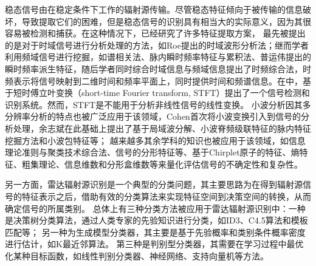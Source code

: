 稳态信号由在稳定条件下工作的辐射源传输。尽管稳态特征倾向于被传输的信息破坏，导致提取它们的困难，但是稳态信号的识别具有相当大的实际意义，因为其很容易被检测和捕获。在这种情况下，已经研究了许多特征提取方案，
最先被提出的是对于时域信号进行分析处理的方法，如Roe提出的时域波形分析法\cite{roe1994real}；继而学者利用频域信号进行挖掘，如谱相关法\cite{jouny1995radar,zhang2001new}、脉内瞬时频率特征\cite{kawalec2004radar,毕大平2005基于瞬时频率的脉内调制识别技术}与累积法\cite{aubry2011cumulants}、普运伟提出的瞬时频率派生特征\cite{普运伟2009雷达辐射源信号瞬时频率派生特征分类方法}，随后学者同时综合时域信息与频域信息提出了时频综合法\cite{chen1999joint,li2011quadratic,moraitakis2000feature}，时频表示将信号映射到二维时间和频率平面上，同时提供时间和频谱信息。在\cite{lopez2005digital}中，基于短时傅立叶变换（short-time Fourier transform, STFT）提出了一个信号检测和识别系统。然而，STFT是不能用于分析非线性信号的线性变换。
小波分析因其多分辨率分析的特点也被广泛应用于该领域，Cohen\cite{cohen2002importance}首次将小波变换引入到信号的分析处理，余志斌在此基础上提出了基于局域波分解\cite{余志斌2008基于局域波分解的雷达辐射源信号时频分析}、小波脊频级联特征\cite{余志斌2010一种新的,余志斌2010基于小波脊频级联特征的雷达辐射源信号识别}的脉内特征挖掘方法和小波包特征\cite{张葛祥2006基于小波包变换和特征选择的雷达辐射源信号识别}等；
越来越多其余学科的知识也被应用于该领域，如信息理论准则与聚类技术综合法\cite{zhou1999combining}、信号的分形特征等\cite{dudczyk2013identification,zhang2003fractal,dudczyk2013fractal}、基于Chirplet原子的特征\cite{朱明2009一种基于}、熵特征\cite{张葛祥2005基于熵特征的雷达辐射源信号识别}、粗集理论\cite{张葛祥2005基于粗集理论的雷达辐射源信号识别}、信息维数\cite{张葛祥2005雷达辐射源信号智能识别方法研究}和分形盒维数\cite{张葛祥2003雷达辐射源信号分形特征研究,张葛祥2004雷达辐射源信号脉内特征分析}等来量化评估信号的不确定性和复杂性。

另一方面，雷达辐射源识别是一个典型的分类问题，其主要思路为在得到辐射源信号的特征表示之后，借助有效的分类算法来实现特征空间到决策空间的转换，从而确定信号的所属类别。
总体上有三种分类方法被应用于雷达辐射源识别中：一种是决策树分类算法，通过人类专家的先验知识进行分类，如ID3\cite{lyden1999id1}、C4.5算法\cite{quinlan1996bagging}和模板匹配\cite{dudczyk2015fast,dudczyk2004applying}等；
另一种为生成模型分类器，其主要是基于先验概率和类别条件概率密度进行估计，如K最近邻算法\cite{cover1967nearest}。
第三种是判别型分类器，其需要在学习过程中最优化某种目标函数，如线性判别分类器\cite{mika1999fisher}、神经网络\cite{jouny1993classification,petrov2013identification,shieh2002vector,willson1990radar}、支持向量机\cite{ren2008radar}等方法。

